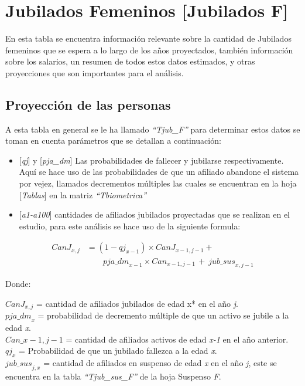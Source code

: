 \documentclass[
  letterpaper,
  DIV=11,
  numbers=noendperiod]{scrreprt}
\providecommand{\tightlist}{%
  \setlength{\itemsep}{0pt}\setlength{\parskip}{0pt}}\usepackage{longtable,booktabs,array}
\begin{document}
\hypertarget{jubilados-femeninos-jubilados-f}{%
\section{Jubilados Femeninos {[}Jubilados
F{]}}\label{jubilados-femeninos-jubilados-f}}

En esta tabla se encuentra información relevante sobre la cantidad de
Jubilados femeninos que se espera a lo largo de los años proyectados,
también información sobre los salarios, un resumen de todos estos datos
estimados, y otras proyecciones que son importantes para el análisis.

\hypertarget{proyecciuxf3n-de-las-personas-2}{%
\subsection{Proyección de las
personas}\label{proyecciuxf3n-de-las-personas-2}}

A esta tabla en general se le ha llamado \emph{``Tjub\_F''} para
determinar estos datos se toman en cuenta parámetros que se detallan a
continuación:

\begin{itemize}
\tightlist
\item
  {[}\emph{qj}{]} y {[}\emph{pja\_dm}{]} Las probabilidades de fallecer
  y jubilarse respectivamente. Aquí se hace uso de las probabilidades de
  que un afiliado abandone el sistema por vejez, llamados decrementos
  múltiples las cuales se encuentran en la hoja {[}\emph{Tablas}{]} en
  la matriz \emph{``Tbiometrica''}
\item
  {[}\emph{a1-a100}{]} cantidades de afiliados jubilados proyectadas que
  se realizan en el estudio, para este análisis se hace uso de la
  siguiente formula:
\end{itemize}

\begin{align} {CanJ}_{x,j} &= \left(1-{qj}_{x-1}\right)\times{CanJ}_{x-1,j-1} + \nonumber  \\ &\qquad {pja\_dm}_{x-1}\times{Can}_{x-1,j-1\ }+\ {jub\_sus}_{x,j-1} \end{align}

Donde:

\({CanJ}_{x,j}\) = cantidad de afiliados jubilados de edad x* en el año
\emph{j}.\\
\({pja\_dm}_x\) = probabilidad de decremento múltiple de que un activo
se jubile a la edad \emph{x}.\\
\(Can\_{x-1,j-1}\) = cantidad de afiliados activos de edad \emph{x-1} en
el año anterior.\\
\({qj}_x\) = Probabilidad de que un jubilado fallezca a la edad
\emph{x}.\\
\({jub\_sus}_{j,x}\) = cantidad de afiliados en suspenso de edad
\emph{x} en el año \emph{j}, este se encuentra en la tabla
\emph{``Tjub\_sus\_F''} de la hoja Suspenso \emph{F}.
\end{document}
